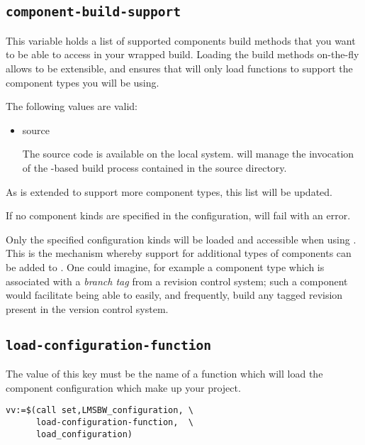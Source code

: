 \subsection{\texttt{component-build-support}}\label{aa:component-build-support}

This variable holds a list of supported components build methods that
you want to be able to access in your wrapped build.  Loading the
build methods on-the-fly allows \lmsbw to be extensible, and ensures
that \lmsbw will only load \make functions to support the component
types you will be using.

The following values are valid:

\begin{itemize}
\item source

  The source code is available on the local system.  \lmsbw will
  manage the invocation of the \make-based build process contained
  in the source directory.

\end{itemize}

As \lmsbw is extended to support more component types, this list will
be updated.

If no component kinds are specified in the configuration, \lmsbw will
fail with an error.

Only the specified configuration kinds will be loaded and accessible
when using \lmsbw.  This is the mechanism whereby support for
additional types of components can be added to \lmsbw.  One could
imagine, for example a component type which is associated with a
\emph{branch tag} from a revision control system; such a component
would facilitate being able to easily, and frequently, build any tagged
revision present in the version control system.

\subsection{\texttt{load-configuration-function}}\label{aa:load-configuration-function}

The value of this key must be the name of a \gnumake function which
will load the component configuration which make up your project.

\begin{verbatim}
vv:=$(call set,LMSBW_configuration, \
      load-configuration-function,  \
      load_configuration)
\end{verbatim}

